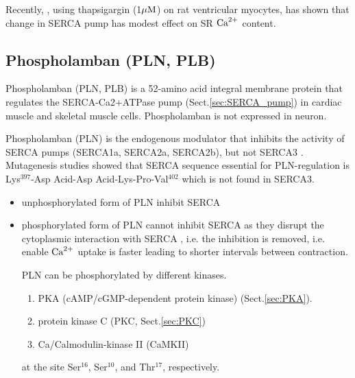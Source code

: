 Recently, \citep{bode2011}, using thapsigargin (1${\mu\text{M}}$) on rat ventricular
myocytes, has shown that change in SERCA pump has modest effect on SR ${\text{Ca}^{2+}}$
content.


\subsection{Phospholamban (PLN, PLB)}
\label{sec:phospholamban}
\label{sec:PLN_SERCA}

Phospholamban (PLN, PLB)  is a 52-amino acid integral membrane protein that
regulates the SERCA-Ca2+ATPase pump (Sect.\ref{sec:SERCA_pump}) in cardiac
muscle and skeletal muscle cells. Phospholamban is not expressed in neuron.

Phospholamban (PLN) is the endogenous modulator that inhibits the activity of
SERCA pumps (SERCA1a, SERCA2a, SERCA2b), but not SERCA3 \citep{james1989}.
Mutagenesis studies showed that SERCA sequence essential for PLN-regulation is
Lys$^{397}$-Asp Acid-Asp Acid-Lys-Pro-Val$^{402}$ \citep{toyofuku1994} which is
not found in SERCA3.

\begin{itemize}
  \item unphosphorylated form of PLN inhibit SERCA
  
  \item phosphorylated form of PLN cannot inhibit SERCA as they disrupt the
  cytoplasmic interaction with SERCA
\citep{koss1996, kadambi1997, MacLennan2003}, i.e. the inhibition
  is removed, i.e. enable ${\text{Ca}^{2+}}$ uptake is faster leading to shorter intervals
  between contraction. 
  
  PLN can be phosphorylated by different kinases.
  
  \begin{enumerate}
    \item  PKA (cAMP/cGMP-dependent protein kinase)
  (Sect.\ref{sec:PKA}).

    \item  protein kinase C (PKC, Sect.\ref{sec:PKC})
    
    \item  Ca/Calmodulin-kinase II (CaMKII)
  \end{enumerate}
  at the site Ser$^{16}$, Ser$^{10}$, and Thr$^{17}$, respectively.
\end{itemize}

